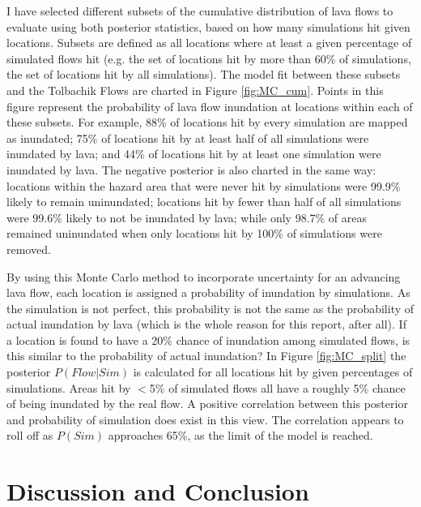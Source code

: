\documentclass[12pt,letter]{article}
\begin{document}
I have selected different subsets of the cumulative distribution of lava flows to evaluate using both posterior statistics, based on how many simulations hit given locations. Subsets are defined as all locations where at least a given percentage of simulated flows hit (e.g. the set of locations hit by more than 60\% of simulations, the set of locations hit by all simulations). The model fit between these subsets and the Tolbachik Flows are charted in Figure \ref{fig:MC_cum}. Points in this figure represent the probability of lava flow inundation at locations within each of these subsets. For example, 88\% of locations hit by every simulation are mapped as inundated; 75\% of locations hit by at least half of all simulations were inundated by lava; and 44\% of locations hit by at least one simulation were inundated by lava. The negative posterior is also charted in the same way: locations within the hazard area that were never hit by simulations were 99.9\% likely to remain uninundated; locations hit by fewer than half of all simulations were 99.6\% likely to not be inundated by lava; while only 98.7\% of areas remained uninundated when only locations hit by 100\% of simulations were removed.

By using this Monte Carlo method to incorporate uncertainty for an advancing lava flow, each location is assigned a probability of inundation by simulations. As the simulation is not perfect, this probability is not the same as the probability of actual inundation by lava (which is the whole reason for this report, after all). If a location is found to have a 20\% chance of inundation among simulated flows, is this similar to the probability of actual inundation? In Figure \ref{fig:MC_split} the posterior $P(Flow|Sim)$ is calculated for all locations hit by given percentages of simulations. Areas hit by $<$5\% of simulated flows all have a roughly 5\% chance of being inundated by the real flow. A positive correlation between this posterior and probability of simulation does exist in this view. The correlation appears to roll off as $P(Sim)$ approaches 65\%, as the limit of the model is reached.




\section{Discussion and Conclusion}
\end{document}
